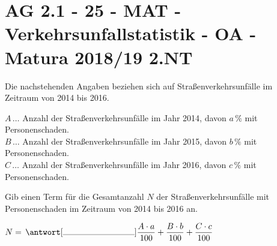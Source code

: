 \section{AG 2.1 - 25 - MAT - Verkehrsunfallstatistik - OA - Matura 2018/19 2.NT}

\begin{beispiel}[AG 2.1]{1}
Die nachstehenden Angaben beziehen sich auf Straßenverkehrsunfälle im Zeitraum von 2014 bis 2016.

$A\,\ldots$ Anzahl der Straßenverkehrsunfälle im Jahr 2014, davon $a\,\%$ mit Personenschaden.\\
$B\,\ldots$ Anzahl der Straßenverkehrsunfälle im Jahr 2015, davon $b\,\%$ mit Personenschaden.\\
$C\,\ldots$ Anzahl der Straßenverkehrsunfälle im Jahr 2016, davon $c\,\%$ mit Personenschaden.

Gib einen Term für die Gesamtanzahl $N$ der Straßenverkehrsunfälle mit Personenschaden im Zeitraum von 2014 bis 2016 an.\leer

$N=\,\antwort[\rule{3cm}{0.3pt}]{\dfrac{A\cdot a}{100}+\dfrac{B\cdot b}{100}+\dfrac{C\cdot c}{100}}$
\end{beispiel}
